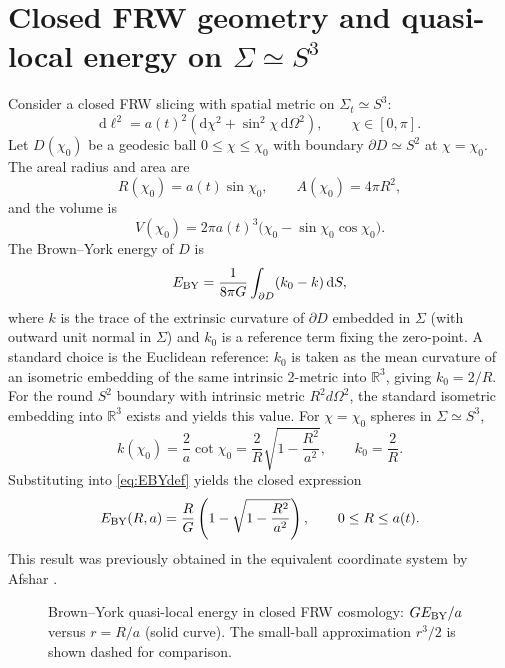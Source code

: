 \documentclass[
  reprint,
  amsmath,amssymb,
  aps,
  prd,
  superscriptaddress,
  nofootinbib,
  longbibliography
]{revtex4-2}
\newcommand{\dd}{\mathrm{d}}
\begin{document}
\section{Closed FRW geometry and quasi-local energy on \texorpdfstring{$\Sigma\simeq S^3$}{Sigma~S3}}
Consider a closed FRW slicing with spatial metric on $\Sigma_t\simeq S^3$:
\begin{equation}
\dd\ell^2=a(t)^2\left(\dd\chi^2+\sin^2\chi\,\dd\Omega^2\right),\qquad \chi\in[0,\pi].
\end{equation}
Let $D(\chi_0)$ be a geodesic ball $0\le\chi\le\chi_0$ with boundary $\partial D\simeq S^2$ at $\chi=\chi_0$. The areal radius and area are
\begin{equation}
R(\chi_0)=a(t)\sin\chi_0,\qquad A(\chi_0)=4\pi R^2,
\end{equation}
and the volume is
\begin{equation}
V(\chi_0)=2\pi a(t)^3\bigl(\chi_0-\sin\chi_0\cos\chi_0\bigr).
\end{equation}
The Brown--York energy of $D$ is
\begin{equation}
E_{\rm BY}=\frac{1}{8\pi G}\int_{\partial D}(k_0-k)\,\dd S,
\label{eq:EBYdef}
\end{equation}
where $k$ is the trace of the extrinsic curvature of $\partial D$ embedded in $\Sigma$ (with outward unit normal in $\Sigma$) and $k_0$ is a reference term fixing the zero-point.
A standard choice is the Euclidean reference: $k_0$ is taken as the mean curvature of an isometric embedding of the same intrinsic 2-metric into $\mathbb{R}^3$, giving $k_0=2/R$. For the round $S^2$ boundary with intrinsic metric $R^2 d\Omega^2$, the standard isometric embedding into $\mathbb{R}^3$ exists and yields this value.
For $\chi=\chi_0$ spheres in $\Sigma\simeq S^3$,
\begin{equation}
k(\chi_0)=\frac{2}{a}\cot\chi_0=\frac{2}{R}\sqrt{1-\frac{R^2}{a^2}},\qquad
k_0=\frac{2}{R}.
\end{equation}
Substituting into \eqref{eq:EBYdef} yields the closed expression
\begin{equation}
E_{\rm BY}(R,a)=\frac{R}{G}\left(1-\sqrt{1-\frac{R^2}{a^2}}\right),
\qquad 0\le R\le a(t).
\label{eq:EBYclosed}
\end{equation}
This result was previously obtained in the equivalent coordinate system by Afshar \cite{Afshar2009}.
\begin{figure}[htbp]
\centering
{}
\caption{Brown--York quasi-local energy in closed FRW cosmology:
$G E_{\rm BY}/a$ versus $r=R/a$ (solid curve).
The small-ball approximation $r^3/2$ is shown dashed for comparison.}
\label{fig:EBY}
\end{figure}
\end{document}
